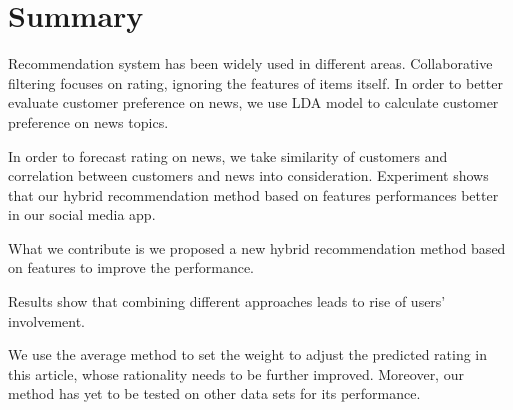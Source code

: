 \documentclass{article}
\begin{document}

\section{Summary}
\label{sec:summary}


Recommendation system has been widely used in different areas. Collaborative filtering focuses on rating, ignoring the features of items itself. In order to better evaluate customer preference on news, we use LDA model to
calculate customer preference on news topics.

In order to forecast rating on news, we take similarity of customers and correlation between customers and news into consideration. Experiment shows that our hybrid recommendation method based on features performances better in our social media app.

What we contribute is we proposed a new hybrid recommendation method based on features to improve the performance.

Results show that combining different approaches leads to rise of users' involvement.

We use the average method to set the weight to adjust the predicted rating in this article, whose rationality needs to be further improved. Moreover, our method has yet to be tested on other data sets for its performance.  


  
\end{document}

